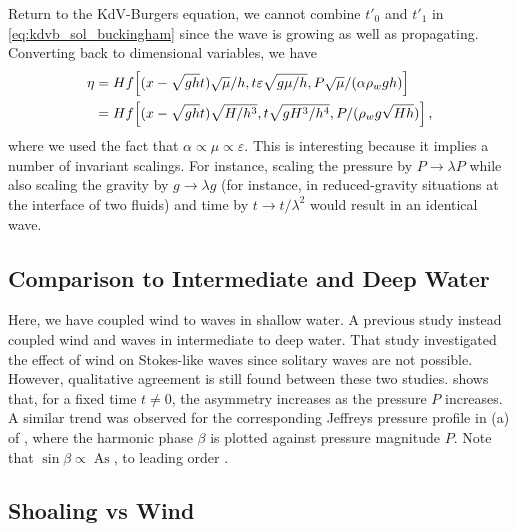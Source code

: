 \documentclass{jfm}
\DeclareMathOperator{\As}{As}
\renewcommand*{\epsilon}{\varepsilon}
\begin{document}
Return to the KdV-Burgers equation, we cannot combine $t'_0$ and $t'_1$
in \cref{eq:kdvb_sol_buckingham} since the wave is growing as well as
propagating.
Converting back to dimensional variables, we have
\begin{equation}
  \begin{split}
    \eta &= H f\bqty{(x - \sqrt{gh} t) \sqrt{\mu}/h, t \epsilon \sqrt{g
      \mu/h}, P \sqrt{\mu}/(\alpha \rho_w g h)} \\
    &= H f\bqty{(x - \sqrt{gh}t) \sqrt{H/h^3}, t \sqrt{g H^3/h^4}, P /(\rho_w
      g \sqrt{H h})} \,,
  \end{split}
\end{equation}
where we used the fact that $\alpha \propto \mu \propto \epsilon$.
This is interesting because it implies a number of invariant scalings.
For instance, scaling the pressure by $P \to \lambda P$ while also
scaling the gravity by $g \to \lambda g$ (for instance, in
reduced-gravity situations at the interface of two fluids) and time by
$t \to t/\lambda^2$ would result in an identical wave.

\subsection{Comparison to Intermediate and Deep Water}
Here, we have coupled wind to waves in shallow water.
A previous study \citep{zdyrski2019wind} instead coupled wind and waves
in intermediate to deep water.
That study investigated the effect of wind on Stokes-like waves since
solitary waves are not possible.
However, qualitative agreement is still found between these two studies.
 shows that, for a fixed time $t \neq 0$,
the asymmetry increases as the pressure $P$ increases.
A similar trend was observed for the corresponding Jeffreys pressure
profile in (a) of \citet{zdyrski2019wind}, where the
harmonic phase $\beta$ is plotted against pressure magnitude $P$.
Note that $\sin{\beta} \propto \As$, to leading order \citep[\cf
eq.\ 3.55 of][]{zdyrski2019wind}.

\subsection{Shoaling vs Wind}
\end{document}
